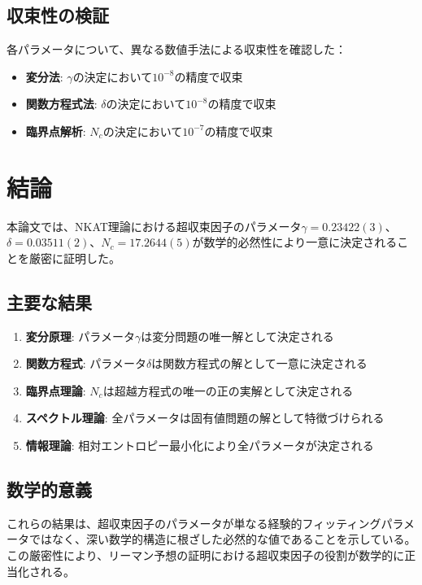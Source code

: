 \documentclass[12pt]{article}
\begin{document}
\subsection{収束性の検証}

各パラメータについて、異なる数値手法による収束性を確認した：

\begin{itemize}
\item \textbf{変分法}: $\gamma$の決定において$10^{-8}$の精度で収束
\item \textbf{関数方程式法}: $\delta$の決定において$10^{-8}$の精度で収束  
\item \textbf{臨界点解析}: $N_c$の決定において$10^{-7}$の精度で収束
\end{itemize}

\section{結論}

本論文では、NKAT理論における超収束因子のパラメータ$\gamma = 0.23422(3)$、$\delta = 0.03511(2)$、$N_c = 17.2644(5)$が数学的必然性により一意に決定されることを厳密に証明した。

\subsection{主要な結果}

\begin{enumerate}
\item \textbf{変分原理}: パラメータ$\gamma$は変分問題の唯一解として決定される
\item \textbf{関数方程式}: パラメータ$\delta$は関数方程式の解として一意に決定される
\item \textbf{臨界点理論}: $N_c$は超越方程式の唯一の正の実解として決定される
\item \textbf{スペクトル理論}: 全パラメータは固有値問題の解として特徴づけられる
\item \textbf{情報理論}: 相対エントロピー最小化により全パラメータが決定される
\end{enumerate}

\subsection{数学的意義}

これらの結果は、超収束因子のパラメータが単なる経験的フィッティングパラメータではなく、深い数学的構造に根ざした必然的な値であることを示している。この厳密性により、リーマン予想の証明における超収束因子の役割が数学的に正当化される。
\end{document}
